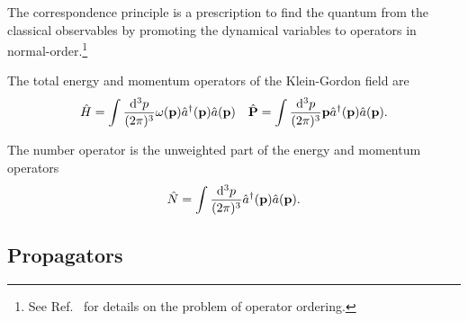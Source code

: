 \begin{definition}
	The correspondence principle is a prescription to find the quantum from the classical observables by promoting the dynamical variables to operators in normal-order.\footnote{See Ref.~\cite[p.~20]{Mukhanov2007} for details on the problem of operator ordering.}
\end{definition}
\begin{corollary}
	The total energy and momentum operators of the Klein-Gordon field are
	\begin{align}
		\hat{H}
		=
		\int\frac{\dd[3]{p}}{(2\pi)^3}
		\omega(\vb{p})\hat{a}^\dagger(\vb{p})\hat{a}(\vb{p})
		&&
		\hat{\vb{P}}
		=
		\int\frac{\dd[3]{p}}{(2\pi)^3}
		\vb{p}\hat{a}^\dagger(\vb{p})\hat{a}(\vb{p})
		\label{eq:qkg_energy_momentum}
		.
	\end{align}
\end{corollary}
\begin{corollary}
	The number operator is the unweighted part of the energy and momentum operators
	\begin{equation}
		\hat{N}
		=
		\int\frac{\dd[3]{p}}{(2\pi)^3}
		\hat{a}^\dagger(\vb{p})
		\hat{a}(\vb{p})
		\label{eq:qkg_number}
		.
	\end{equation}
\end{corollary}

\subsection{Propagators}

